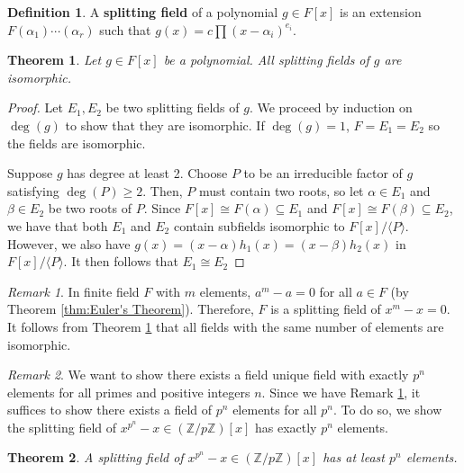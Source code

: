\documentclass[
    parskip=half,
    toc=flat,
    toc=sectionentrydotfill,
]{scrartcl}  %
\theoremstyle{definition}
\newtheorem{definition}{Definition}[section]
\theoremstyle{plain}
\newtheorem{theorem}{Theorem}[definition]
\theoremstyle{remark}
\newtheorem{remark}{Remark}[definition]
\begin{document}
\begin{definition}
    A \textbf{splitting field} of a polynomial $g\in F[x]$ is an extension
    $F(\alpha_1)\cdots(\alpha_r)$ such that $g(x)=c\prod (x-\alpha_i)^{e_i}$.
\end{definition}

\begin{theorem}
    \label{thm:splitting fields are isomorphic}
    Let $g\in F[x]$ be a polynomial.
    All splitting fields of $g$ are isomorphic.
\end{theorem}

\begin{proof}
    Let $E_1,E_2$ be two splitting fields of $g$.
    We proceed by induction on $\deg(g)$ to show that they are isomorphic.
    If $\deg(g)=1$, $F=E_1=E_2$ so the fields are isomorphic.

    Suppose $g$ has degree at least 2.
    Choose $P$ to be an irreducible factor of $g$ satisfying $\deg(P)\geq 2$.
    Then, $P$ must contain two roots, so let $\alpha\in E_1$ and $\beta\in E_2$ be two roots of $P$.
    Since $F[x]\cong F(\alpha)\subseteq E_1$ and $F[x]\cong F(\beta)\subseteq E_2$, we have that
    both $E_1$ and $E_2$ contain subfields isomorphic to $F[x]/\langle P\rangle$.
    However, we also have $g(x)=(x-\alpha)h_1(x)=(x-\beta)h_2(x)$ in $F[x]/\langle P\rangle$.
    It then follows that $E_1\cong E_2$
\end{proof}

\begin{remark}
    \label{rem:same size fields are isomorphic}
    In finite field $F$ with $m$ elements, $a^m-a=0$ for all $a\in F$ (by Theorem \ref{thm:Euler's Theorem}).
    Therefore, $F$ is a splitting field of $x^m-x=0$.
    It follows from Theorem \ref{thm:splitting fields are isomorphic} that all fields with the same
    number of elements are isomorphic.
\end{remark}

\begin{remark}
    We want to show there exists a field unique field with exactly $p^n$ elements for all primes
    and positive integers $n$.
    Since we have Remark \ref{rem:same size fields are isomorphic}, it suffices to show there
    exists a field of $p^n$ elements for all $p^n$.
    To do so, we show the splitting field of $x^{p^n}-x\in (\mathbb{Z}/p\mathbb{Z})[x]$ has exactly
    $p^n$ elements.
\end{remark}

\begin{theorem}
    A splitting field of $x^{p^n}-x\in (\mathbb{Z}/p\mathbb{Z})[x]$ has at least $p^n$ elements.
\end{theorem}
\end{document}
